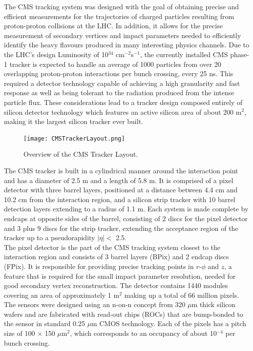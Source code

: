 The CMS tracking system was designed with the goal of obtaining precise and efficient measurements for the trajectories of charged particles resulting from proton-proton collisions at the LHC. 
In addition, it allows for the precise measurement of secondary vertices and impact parameters needed to efficiently identify the heavy flavours produced in many interesting physics channels. Due to the LHC's design Luminosity of 10$^{34}$ cm$^{-2}$s$^{-1}$, the currently installed CMS phase-1 tracker is expected to handle an average of 1000 particles from over 20 overlapping proton-proton interactions per bunch crossing, every 25 ns. This required a detector technology capable of achieving a high granularity and fast response as well as being tolerant to the radiation produced from the intense particle flux. These considerations lead to a tracker design composed entirely of silicon detector technology which features an active silicon area of about 200 m$^2$, making it the largest silicon tracker ever built\cite{CMSdet1}.\\

\begin{figure}[tb]
\begin{center}
\texttt{[image: CMSTrackerLayout.png]} 
\caption{Overview of the CMS Tracker Layout\cite{CMSdet2}.}
\label{CMSTrackerLayout} 
\end{center}
\end{figure}

The CMS tracker is built in a cylindrical manner around the interaction point and has a diameter of 2.5 m and a length of 5.8 m. It is comprised of a pixel detector with three barrel layers, positioned at a distance between 4.4 cm and 10.2 cm from the interaction region, and a silicon strip tracker with 10 barrel detection layers extending to a radius of 1.1 m. Each system is made complete by endcaps at opposite sides of the barrel, consisting of 2 discs for the pixel detector and 3 plus 9 discs for the strip tracker, extending the acceptance region of the tracker up to a pseudorapidity $|\eta| <$ 2.5.\\

The pixel detector is the part of the CMS tracking system closest to the interaction region and consists of 3 barrel layers (BPix) and 2 endcap discs (FPix). It is responsible for providing precise tracking points in $r$-$\phi$ and $z$, a feature that is required for the small impact parameter resolution, needed for good secondary vertex reconstruction. The detector contains 1440 modules covering an area of approximately 1 m$^2$ making up a total of 66 million pixels. The sensors were designed using an n-on-n concept from 320 $\mu$m thick silicon wafers and are fabricated with read-out chips (ROCs) that are bump-bonded to the sensor in standard 0.25 $\mu$m CMOS technology. Each of the pixels has a pitch size of 100 $\times$ 150 $\mu$m$^2$, which corresponds to an occupancy of about 10$^{-4}$ per bunch crossing.\\

